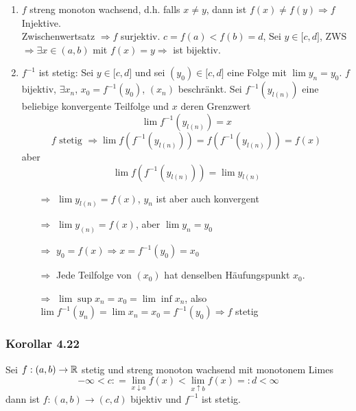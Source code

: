 \begin{beweis}{}
\begin{enumerate}
\item $f$ streng monoton wachsend, d.h. falls $x\not=y$, dann ist $f\left( x\right)\not=f\left( y\right)\Rightarrow f$ Injektive.\\

Zwischenwertsatz $\Rightarrow f$ surjektiv. $c=f(a)<f(b)=d$, Sei $y\in\lbrack c,d\rbrack$, ZWS $\Rightarrow\exists x\in\left( a,b\right)$ mit $f(x)=y\Rightarrow$ ist bijektiv.
\item $f^{-1}$ ist stetig: Sei $y\in\lbrack c,d\rbrack$ und sei $\left( y_0\right)\in\lbrack c,d\rbrack$ eine Folge mit $\lim y_n=y_0$. $f$ bijektiv, $\exists x_n$, $x_0=f^{-1}\left( y_0\right)$, $\left( x_n\right)$ beschränkt. Sei $f^{-1}\left( y_{l(n)}\right)$ eine beliebige konvergente Teilfolge und $x$ deren Grenzwert
\[ \lim f^{-1}\left( y_{l(n)}\right)=x\]
\[ f\text{ stetig }\Rightarrow\lim f\left( f^{-1}\left( y_{l(n)}\right)\right) = f\left( f^{-1}\left( y_{l(n)}\right)\right)= f(x) \]
aber
\[\lim f\left( {{f^{ - 1}}\left( {{y_{l(n)}}} \right)} \right) = \lim {y_{l(n)}}\]
\begin{enumerate}
\item[$\Rightarrow$] $\lim {y_{l(n)}}=f(x)$, $y_n$ ist aber auch konvergent
\item[$\Rightarrow$] $\lim {y_{(n)}}=f(x)$, aber $\lim y_n=y_0$
\item[$\Rightarrow$] $y_0=f(x)\Rightarrow x=f^{-1}\left( y_0\right)=x_0$
\item[$\Rightarrow$] Jede Teilfolge von $\left( x_0\right)$ hat denselben Häufungspunkt $x_0$.
\item[$\Rightarrow$] $\lim\sup x_n=x_0=\lim\inf x_n$, also $\lim {f^{ - 1}}\left( {{y_n}} \right) = \lim {x_n} = {x_0} = {f^{ - 1}}\left( {{y_0}} \right)\Rightarrow f$ stetig
\end{enumerate}
\end{enumerate}
\end{beweis}

\subsubsection*{Korollar 4.22}
Sei $f:\left( a,b\right)\to\mathbb{R}$ stetig und streng monoton wachsend mit monotonem Limes
\[ - \infty  < c: = \mathop {\lim }\limits_{x \downarrow a} f\left( x \right) < \mathop {\lim }\limits_{x \uparrow b} f\left( x \right) = :d < \infty \]
dann ist $f:\left( a,b\right)\to\left( c,d\right)$ bijektiv und $f^{-1}$ ist stetig.

